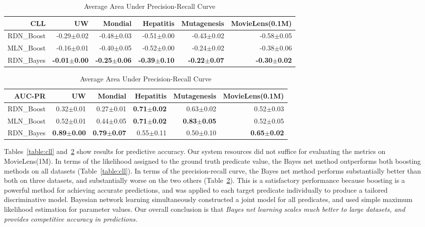 \documentclass[runningheads,a4paper]{llncs}
\begin{document}
\begin{table}[htbp]
 \centering
  \caption{Average Conditional Log-Likelihood}
    \begin{tabular}{|r|r|r|r|r|r|} \hline
    \textbf{CLL} & UW    & Mondial  & Hepatitis & Mutagenesis  & MovieLens(0.1M) \\ \hline
   RDN\_Boost & -0.29$\pm$0.02 & -0.48$\pm$0.03 & -0.51$\pm$0.00 & -0.43$\pm$0.02 & -0.58$\pm$0.05 \\
    MLN\_Boost & -0.16$\pm$0.01 & -0.40$\pm$0.05 & -0.52$\pm$0.00 & -0.24$\pm$0.02 & -0.38$\pm$0.06 \\
    RDN\_Bayes & \textbf{-0.01$\pm$0.00} & \textbf{-0.25$\pm$0.06} & \textbf{-0.39$\pm$0.10} & \textbf{-0.22$\pm$0.07} & \textbf{-0.30$\pm$0.02} \\ \hline
    \end{tabular}%
  \label{table:cll}%

 \centering 
 \vspace{0.1cm}
 \caption{Average Area Under Precision-Recall Curve}
    \begin{tabular}{|r|r|r|r|r|r|} \hline
    \textbf{AUC-PR} & UW    & Mondial  & Hepatitis & Mutagenesis  & MovieLens(0.1M) \\ \hline
    RDN\_Boost & 0.32$\pm$0.01 & 0.27$\pm$0.01 & \textbf{0.71$\pm$0.02} & 0.63$\pm$0.02 & 0.52$\pm$0.03 \\
    MLN\_Boost & 0.52$\pm$0.01 & 0.44$\pm$0.05 & \textbf{0.71$\pm$0.02} & \textbf{0.83$\pm$0.05} & 0.52$\pm$0.05 \\
    RDN\_Bayes & \textbf{0.89$\pm$0.00} & \textbf{0.79$\pm$0.07} & 0.55$\pm$0.11 & 0.50$\pm$0.10 & \textbf{0.65$\pm$0.02} \\ \hline
    \end{tabular}%
  \label{table:AUC}%
\end{table}%

Tables~\ref{table:cll} and~\ref{table:AUC} show results for predictive accuracy. Our system resources did not suffice for evaluating the metrics on MovieLens(1M).  In terms of the likelihood assigned to the ground truth predicate value, the Bayes net method outperforms both boosting methods on all datasets (Table~\ref{table:cll}). In terms of the precision-recall curve, the Bayes net method performs substantially better than both on three datasets, and substantially worse on the two others (Table~\ref{table:AUC}). This is a satisfactory performance because boosting is a powerful method for achieving accurate predictions, and was applied to each target predicate individually to produce a tailored discriminative model. Bayesian network learning simultaneously constructed a joint model for all predicates, and used simple maximum likelihood estimation for parameter values.
 Our overall conclusion is that \emph{Bayes net learning scales much better to large datasets, and provides competitive accuracy in predictions.} 
 
\end{document}
